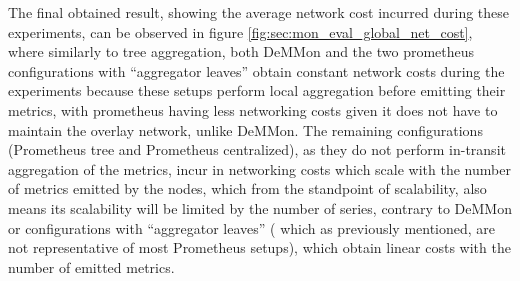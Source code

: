 The final obtained result, showing the average network cost incurred during these experiments, can be observed in figure \ref{fig:sec:mon_eval_global_net_cost}, where similarly to tree aggregation, both DeMMon and the two prometheus configurations with ``aggregator leaves'' obtain constant network costs during the experiments because these setups perform local aggregation before emitting their metrics, with prometheus having less networking costs given it does not have to maintain the overlay network, unlike DeMMon. The remaining configurations (Prometheus tree and Prometheus centralized), as they do not perform in-transit aggregation of the metrics, incur in networking costs which scale with the number of metrics emitted by the nodes, which from the standpoint of scalability, also means its scalability will be limited by the number of series, contrary to DeMMon or configurations with ``aggregator leaves'' ( which as previously mentioned, are not representative of most Prometheus setups), which obtain linear costs with the number of emitted metrics.



